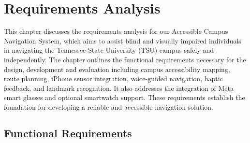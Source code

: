 \documentclass[12pt,letterpaper,oneside,reqno]{book}
\theoremstyle{plain}
\theoremstyle{definition}
\theoremstyle{plain}
\theoremstyle{remark}
\theoremstyle{plain}
\theoremstyle{definition}
\theoremstyle{plain}
\newcommand{\mainreq}[2]{%
    \par\medskip
    \noindent
    \hangindent=1cm
    \hangafter=1
    \makebox[1cm][l]{\textbf{#1}}%
    \textbf{#2}\par
}
\newcommand{\reqdesc}[1]{%
    \par\noindent
    \leftskip=1cm
    #1\par
    \leftskip=0pt
}
\newcommand{\reqleveltwo}[2]{%
    \par\smallskip
    \noindent
    \hangindent=2cm
    \hangafter=1
    \hspace*{0.5cm}%
    \makebox[1.5cm][l]{\textbf{#1}}%
    \textbf{#2}\par
}
\newcommand{\subreq}[2]{%
    \par\noindent
    \hangindent=3cm
    \hangafter=1
    \hspace*{1cm}%
    \makebox[2cm][l]{\textbf{#1}}%
    #2\par
}
\begin{document}
\chapter{Requirements Analysis}

\par\noindent\begingroup\color{black}\noindent This chapter discusses the requirements analysis for our
Accessible Campus Navigation System, which aims to assist blind
and visually impaired individuals in navigating the Tennessee
State University (TSU) campus safely and independently.
The chapter outlines the functional requirements necessary
for the design, development and evaluation including campus accessibility mapping,
route planning, iPhone sensor integration,
voice-guided navigation, haptic feedback, and landmark
recognition. It also addresses the integration of Meta
smart glasses and optional smartwatch support. These requirements establish the foundation for developing
a reliable and accessible navigation solution.\par\endgroup


\section{Functional Requirements}

\newlength{\reqMainTextIndent}
\newlength{\reqSecondIndent}
\newlength{\reqSecondLabelWidth}
\newlength{\reqThirdIndent}
\newlength{\reqThirdLabelWidth}
\setlength{\reqMainTextIndent}{2.1em}
\setlength{\reqSecondIndent}{2.1em}
\setlength{\reqSecondLabelWidth}{3.4em}
\setlength{\reqThirdIndent}{5.5em}
\setlength{\reqThirdLabelWidth}{4.3em}

\newcommand{\campusreqitem}[5]{%
  \par\smallskip
  \begingroup
  \leftskip=#1\relax
  \parindent=0pt
  \hangindent=#2\relax\hangafter=1
  \noindent\makebox[#2][l]{{\normalfont\mdseries #3}}{#4 #5}\par
  \endgroup
}
\def\mainreq#1#2{\campusreqitem{0pt}{\reqMainTextIndent}{#1}{\bfseries}{#2}}
\def\reqleveltwo#1#2{\campusreqitem{\reqSecondIndent}{\reqSecondLabelWidth}{#1}{\normalfont}{#2}}
\def\subreq#1#2{\campusreqitem{\reqThirdIndent}{\reqThirdLabelWidth}{#1}{\normalfont}{#2}}
\renewcommand{\reqdesc}[1]{%
  \par\begingroup
  \leftskip=\reqMainTextIndent\relax
  \parindent=0pt\noindent #1\par
  \endgroup
}
\end{document}
